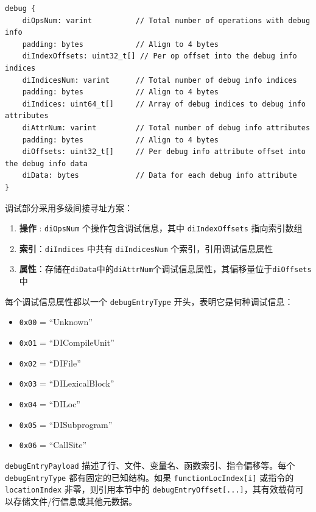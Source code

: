 \documentclass{article}
\begin{document}
\begin{lstlisting}
debug {
    diOpsNum: varint          // Total number of operations with debug info
    padding: bytes            // Align to 4 bytes
    diIndexOffsets: uint32_t[] // Per op offset into the debug info indices
    diIndicesNum: varint      // Total number of debug info indices
    padding: bytes            // Align to 4 bytes
    diIndices: uint64_t[]     // Array of debug indices to debug info attributes
    diAttrNum: varint         // Total number of debug info attributes
    padding: bytes            // Align to 4 bytes
    diOffsets: uint32_t[]     // Per debug info attribute offset into the debug info data
    diData: bytes             // Data for each debug info attribute
}
\end{lstlisting}

调试部分采用多级间接寻址方案：


\begin{enumerate}
\item \textbf{操作} : \texttt{diOpsNum} 个操作包含调试信息，其中 \texttt{diIndexOffsets} 指向索引数组
\item \textbf{索引}：\texttt{diIndices} 中共有 \texttt{diIndicesNum} 个索引，引用调试信息属性
\item \textbf{属性}：存储在\texttt{diData}中的\texttt{diAttrNum}个调试信息属性，其偏移量位于\texttt{diOffsets}中

\end{enumerate}
每个调试信息属性都以一个 \texttt{debugEntryType} 开头，表明它是何种调试信息：


\begin{itemize}
\item \texttt{0x00} = ``Unknown''
\item \texttt{0x01} = ``DICompileUnit''
\item \texttt{0x02} = ``DIFile''
\item \texttt{0x03} = ``DILexicalBlock''
\item \texttt{0x04} = ``DILoc''
\item \texttt{0x05} = ``DISubprogram''
\item \texttt{0x06} = ``CallSite''

\end{itemize}
\texttt{debugEntryPayload} 描述了行、文件、变量名、函数索引、指令偏移等。每个 \texttt{debugEntryType} 都有固定的已知结构。如果 \texttt{functionLocIndex[i]} 或指令的 \texttt{locationIndex} 非零，则引用本节中的 \texttt{debugEntryOffset[...]}，其有效载荷可以存储文件/行信息或其他元数据。
\end{document}
